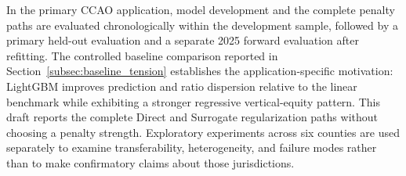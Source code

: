 \documentclass[10pt]{article}
\theoremstyle{definition}
\newcommand{\1}{\mathbf{1}}
\begin{document}

{In the primary CCAO application, model development and the complete penalty paths are evaluated chronologically within the development sample, followed by a primary held-out evaluation and a separate 2025 forward evaluation after refitting. The controlled baseline comparison reported in Section~\ref{subsec:baseline_tension} establishes the application-specific motivation: LightGBM improves prediction and ratio dispersion relative to the linear benchmark while exhibiting a stronger regressive vertical-equity pattern. This draft reports the complete Direct and Surrogate regularization paths without choosing a penalty strength. Exploratory experiments across six counties are used separately to examine transferability, heterogeneity, and failure modes rather than to make confirmatory claims about those jurisdictions.}

\end{document}

